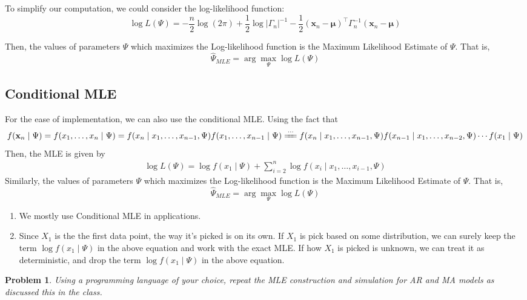 \documentclass[11pt]{article}
\theoremstyle{plain} %
\newtheorem{problem}[theorem]{Problem}
\theoremstyle{remark}
\newenvironment{remark}
  {\pushQED{\qed}\renewcommand{\qedsymbol}{$\triangle$}\remarkx}
  {\popQED\endremarkx}
\begin{document}
To simplify our computation, we could consider the log-likelihood function:
$$
  \log L(\Psi)= -\frac{n}{2} \log (2 \pi)+\frac{1}{2} \log \left|\Gamma_n\right|^{-1}-\frac{1}{2}(\mathbf{x}_n-\boldsymbol{\mu})^\top \Gamma_n^{-1}(\mathbf{x}_n-\boldsymbol{\mu})
$$

Then, the values of parameters $\Psi$ which maximizes the Log-likelihood function is the Maximum Likelihood Estimate of $\Psi$. That is,
$$
  \hat{\Psi}_{MLE}=\arg \max_{\Psi} \log L(\Psi)
$$
\subsection*{Conditional MLE}
For the ease of implementation, we can also use the conditional MLE. Using the fact that
$$
  f(\mathbf{x}_n \mid \Psi) = f(x_1, \ldots, x_n \mid \Psi)
  = f(x_n \mid x_1, \ldots, x_{n-1}, \Psi) f(x_1, \ldots, x_{n-1} \mid \Psi)
  \xlongequal{\cdots} f(x_n \mid x_1, \ldots, x_{n-1}, \Psi)f(x_{n-1} \mid x_1, \ldots, x_{n-2}, \Psi) \cdots f(x_1 \mid \Psi)
$$
Then, the MLE is given by
\begin{align}
  \log L(\Psi) = \log f(x_1 \mid \Psi) + \sum_{i=2}^{n} \log f(x_{i} \mid x_1, \ldots, x_{i-1}, \Psi) \label{eq:conditional MLE}
\end{align}
Similarly, the values of parameters $\Psi$ which maximizes the Log-likelihood function is the Maximum Likelihood Estimate of $\Psi$. That is,
$$
  \hat{\Psi}_{MLE}=\arg \max_{\Psi} \log L(\Psi)
$$

\begin{remark}\hfill
  \begin{enumerate}
    \item We mostly use Conditional MLE in applications.
    \item Since $X_1$ is the the first data point, the way it's picked is on its own. If $X_1$ is pick based on some distribution, we can surely keep the term $\log f(x_1\mid \Psi)$ in the above equation
          and work with the exact MLE. If how $X_1$ is picked is unknown, we can treat it as deterministic, and drop the term $\log f(x_1\mid \Psi)$ in the above equation.
  \end{enumerate}

\end{remark}

\begin{problem}
Using a programming language of your choice, repeat the MLE construction and simulation for AR and MA models as discussed this in the class.
\end{problem}
\end{document}
